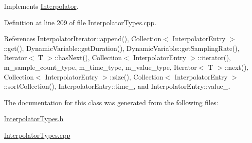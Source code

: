 Implements \hyperlink{classInterpolator_a3}{Interpolator}.

Definition at line 209 of file Interpolator\-Types.cpp.

References Interpolator\-Iterator::append(), Collection$<$ Interpolator\-Entry $>$::get(), Dynamic\-Variable::get\-Duration(), Dynamic\-Variable::get\-Sampling\-Rate(), Iterator$<$ T $>$::has\-Next(), Collection$<$ Interpolator\-Entry $>$::iterator(), m\_\-sample\_\-count\_\-type, m\_\-time\_\-type, m\_\-value\_\-type, Iterator$<$ T $>$::next(), Collection$<$ Interpolator\-Entry $>$::size(), Collection$<$ Interpolator\-Entry $>$::sort\-Collection(), Interpolator\-Entry::time\_\-, and Interpolator\-Entry::value\_\-.

The documentation for this class was generated from the following files:\begin{CompactItemize}
\item 
\hyperlink{InterpolatorTypes_8h}{Interpolator\-Types.h}\item 
\hyperlink{InterpolatorTypes_8cpp}{Interpolator\-Types.cpp}\end{CompactItemize}

